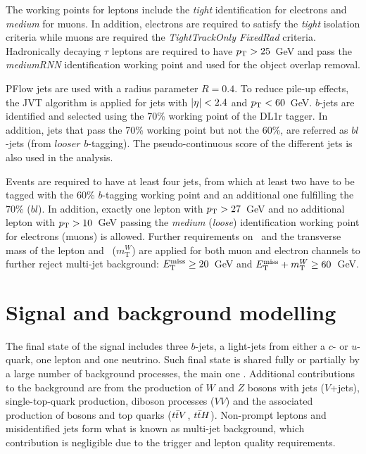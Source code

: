 The working points for leptons include the \textit{tight} identification for electrons and \textit{medium} for muons. In addition, electrons are required to satisfy the \textit{tight} isolation criteria while muons are required the \textit{TightTrackOnly FixedRad} criteria. Hadronically decaying $\tau$ leptons are required to have $p_{\text{T}}>25$~GeV and pass the \textit{mediumRNN} identification working point and used for the object overlap removal.

PFlow jets are used with a radius parameter $R=0.4$. To reduce pile-up effects, the JVT algorithm is applied for jets with $\abs{\eta}<2.4$ and $p_{\text{T}}<60$~GeV. 
$b$-jets are identified and selected using the 70\% working point of the DL1r tagger. In addition, jets that pass the 70\% working point but not the 60\%, are referred as $bl$-jets (from $looser$ $b$-tagging). The pseudo-continuous score of the different jets is also used in the analysis.

Events are required to have at least four jets, from which at least two have to be tagged with the 60\% $b$-tagging working point and an additional one fulfilling the 70\% ($bl$). In addition, exactly one lepton with $p_{\text{T}}>27$~GeV and no additional lepton with $p_{\text{T}}>10$~GeV passing the \textit{medium} (\textit{loose}) identification working point for electrons (muons) is allowed. Further requirements on \MET\ and the transverse mass of the lepton and \MET\ ($m_{\text{T}}^W$) are applied for both muon and electron channels to further reject multi-jet background: $E_{\text{T}}^{\text{miss}}\geq20$~GeV and $E_{\text{T}}^{\text{miss}}+m_{\text{T}}^W\geq60$~GeV.

\section{Signal and background modelling}

The final state of the signal includes three $b$-jets, a light-jets from either a $c$- or $u$-quark, one lepton and one neutrino. Such final state is shared fully or partially by a large number of background processes, the main one \ttjets. Additional contributions to the background are from the production of $W$ and $Z$ bosons with jets ($V$+jets), single-top-quark production, diboson processes ($VV$) and the associated production of bosons and top quarks ($t\bar{t} V$, $t\bar{t} H$). Non-prompt leptons and misidentified jets form what is known as multi-jet background, which contribution is negligible due to the trigger and lepton quality requirements.


